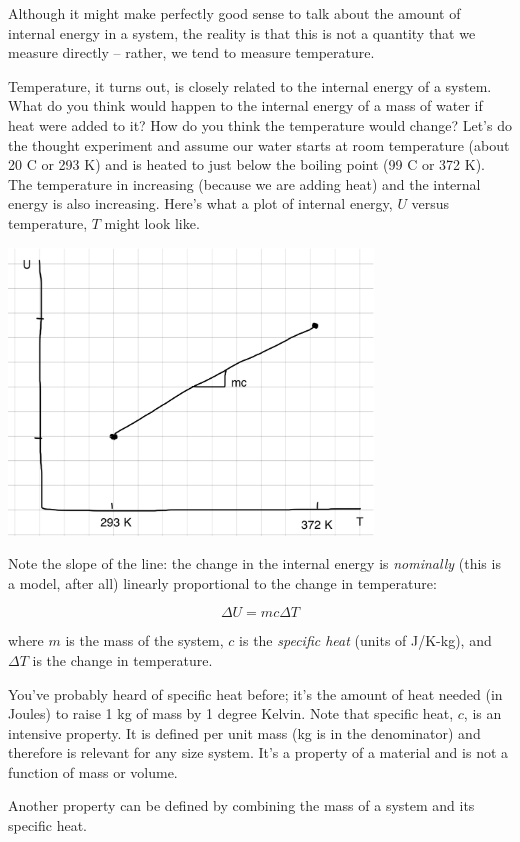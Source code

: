 Although it might make perfectly good sense to talk about the amount of internal energy in a system, the reality is that this is not a quantity that we measure directly -- rather, we tend to measure temperature.  

Temperature, it turns out, is closely related to the internal energy of a system. What do you think would happen to the internal energy of a mass of water if heat were added to it? How do you think the temperature would change? Let's do the thought experiment and assume our water starts at room temperature (about 20 C or 293 K) and is heated to just below the boiling point (99 C or 372 K). The temperature in increasing (because we are adding heat) and the internal energy is also increasing. Here's what a plot of internal energy, $U$ versus temperature, $T$ might look like. 

\beforefig
 \centerline{\includegraphics[height=3in]{figs/SensibleHeatFigure.png}}
\afterfig

Note the slope of the line: the change in the internal energy is {\it nominally} (this is a model, after all) linearly proportional to the change in temperature:

$$ \Delta U = m c \Delta T$$

where $m$  is the mass of the system, $c$ is the {\it specific heat} (units of J/K-kg), and $\Delta T$ is the change in temperature.

You've probably heard of specific heat before; it's the amount of heat needed (in Joules) to raise 1 kg of mass by 1 degree Kelvin. Note that specific heat, $c$, is an intensive property. It is defined per unit mass (kg is in the denominator) and therefore is relevant for any size system. It's a property of a material and is not a function of mass or volume.

Another property can be defined by combining the mass of a system and its specific heat.

